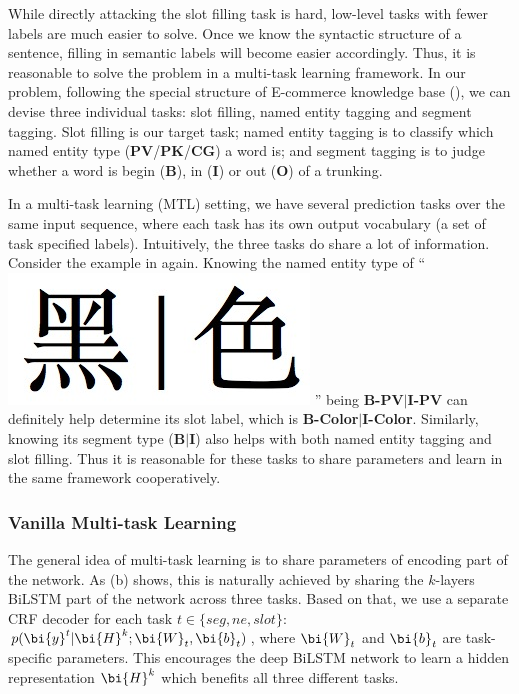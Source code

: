While directly attacking the slot filling task is hard,
low-level tasks with fewer labels are much easier to solve.
Once we know the syntactic structure of a sentence,
filling in semantic labels will become easier accordingly.
Thus, it is reasonable to solve the problem in a multi-task learning 
framework.
In our problem, 
following the special structure of E-commerce knowledge base (),
we can devise three individual tasks: slot filling, named entity tagging and segment tagging.
Slot filling is our target task;
named entity tagging is to classify which named entity type (\textbf{PV}/\textbf{PK}/\textbf{CG}) a word is;
and segment tagging is to judge 
whether a word is begin (\textbf{B}), in (\textbf{I}) or out (\textbf{O}) of a trunking.

In a multi-task learning (MTL) setting, 
we have several prediction tasks over the same input sequence,
where each task has its own output vocabulary (a set of task 
specified labels).
Intuitively, the three tasks do share a lot of information.
Consider the example in  again. 
Knowing the named entity type of 
	``
	\includegraphics[height=1.4\fontcharht\font`\B]{figures/heise.png}
	''
being 
\textbf{B-PV}$|$\textbf{I-PV}
can definitely help determine its slot label, 
which is \textbf{B-Color}$|$\textbf{I-Color}.
Similarly, knowing its segment type (\textbf{B}$|$\textbf{I}) 
also helps with both named entity tagging and slot filling.
Thus it is reasonable for these tasks to share parameters
and learn in the same framework cooperatively.

\subsubsection{Vanilla Multi-task Learning}
The general idea of multi-task learning
is to share parameters of encoding part of the network.
As (b) shows,
this is naturally achieved by sharing 
the $k$-layers BiLSTM part of the network across three tasks.
Based on that,
we use a separate CRF decoder for each task $t \in \{seg, ne, slot\}$:
$p(\bi{y}^t|\bi{H}^k;\bi{W}_t, \bi{b}_t)$,
where $\bi{W}_t$ and $\bi{b}_t$ are task-specific parameters.
This encourages the deep BiLSTM network 
to learn a hidden representation $\bi{H}^k$
which benefits all three different tasks.

